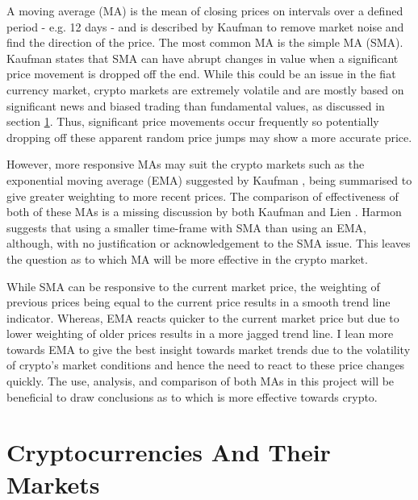 A moving average (MA) is the mean of closing prices on intervals over a defined period - e.g. 12 days - and is described by Kaufman \cite{BOOK:Kaufman:2013} to remove market noise and find the direction of the price. The most common MA is the simple MA (SMA). Kaufman \cite{BOOK:Kaufman:2013} states that SMA can have abrupt changes in value when a significant price movement is dropped off the end. While this could be an issue in the fiat currency market, crypto markets are extremely volatile and are mostly based on significant news and biased trading than fundamental values, as discussed in section \ref{sec:related:cryptoAndTheirMarkets}. Thus, significant price movements occur frequently so potentially dropping off these apparent random price jumps may show a more accurate price. 

However, more responsive MAs may suit the crypto markets such as the exponential moving average (EMA) suggested by Kaufman \cite{BOOK:Kaufman:2013}, being summarised to give greater weighting to more recent prices. The comparison of effectiveness of both of these MAs is a missing discussion by both Kaufman \cite{BOOK:Kaufman:2013} and Lien \cite{BOOK:Lien:2016}. Harmon \cite{BOOK:Harmon:2014} suggests that using a smaller time-frame with SMA than using an EMA, although, with no justification or acknowledgement to the SMA issue. This leaves the question as to which MA will be more effective in the crypto market. 
    
While SMA can be responsive to the current market price, the weighting of previous prices being equal to the current price results in a smooth trend line indicator. Whereas, EMA reacts quicker to the current market price but due to lower weighting of older prices results in a more jagged trend line. I lean more towards EMA to give the best insight towards market trends due to the volatility of crypto's market conditions and hence the need to react to these price changes quickly. The use, analysis, and comparison of both MAs in this project will be beneficial to draw conclusions as to which is more effective towards crypto.




\section{Cryptocurrencies And Their Markets}
\label{sec:related:cryptoAndTheirMarkets}

